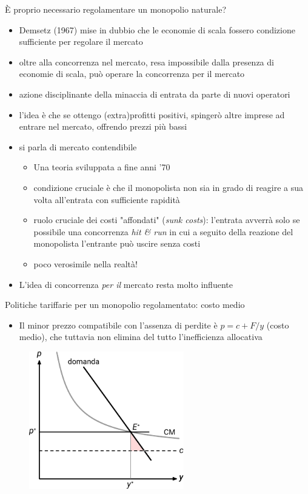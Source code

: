 \documentclass[aspectratio=149,11pt]{beamer}
\begin{document}
\begin{frame}{È proprio necessario regolamentare un monopolio naturale?}
\begin{itemize}
\item Demsetz (1967) mise in dubbio che le economie di scala fossero condizione
\alert{sufficiente} per regolare il mercato
\item oltre alla concorrenza \alert{nel} mercato, resa impossibile dalla presenza di
economie di scala, può operare la concorrenza \alert{per il} mercato
\item azione disciplinante della minaccia di entrata da parte di nuovi operatori
\item l'idea è che se ottengo (extra)profitti positivi, spingerò altre imprese ad
entrare nel mercato, offrendo prezzi più bassi
\item si parla di \alert{mercato contendibile}
\begin{itemize}
\item Una teoria sviluppata a fine anni '70
\item condizione cruciale è che il monopolista non sia in grado di reagire a
sua volta all'entrata con sufficiente rapidità
\item ruolo cruciale dei costi "affondati" (\emph{sunk costs}): l'entrata avverrà
solo se possibile una concorrenza \emph{hit \& run} in cui a seguito della
reazione del monopolista l'entrante può uscire senza costi
\item poco verosimile nella realtà!
\end{itemize}
\item L'idea di concorrenza \emph{per il} mercato resta molto influente
\end{itemize}
\end{frame}

\begin{frame}{Politiche tariffarie per un monopolio regolamentato: costo medio}
\begin{itemize}
\item Il minor prezzo compatibile con l'assenza di perdite è $p=c+F/y$ (\alert{costo medio}),
che tuttavia non elimina del tutto l'inefficienza allocativa
\end{itemize}

\begin{figure}[htbp]
\centering
\includegraphics[height=6cm]{./figure/monopolio-naturale-4-color.pdf}
\end{figure}
\end{frame}
\end{document}
